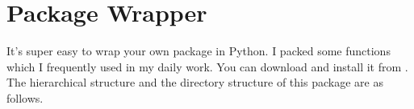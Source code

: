 \documentclass[letterpaper,12pt,english]{sphinxmanual}
\begin{document}
\begin{sphinxVerbatim}[commandchars=\\\{\}]
                                  
                            
                           
                          
                           
\end{sphinxVerbatim}


\chapter{Package Wrapper}
\label{\detokenize{pack:package-wrapper}}\label{\detokenize{pack:pack}}\label{\detokenize{pack::doc}}
It’s super easy to wrap your own package in Python. I packed some functions which I frequently
used in my daily work. You can download and install it from . The hierarchical
structure and the directory structure of this package are as follows.
\end{document}
